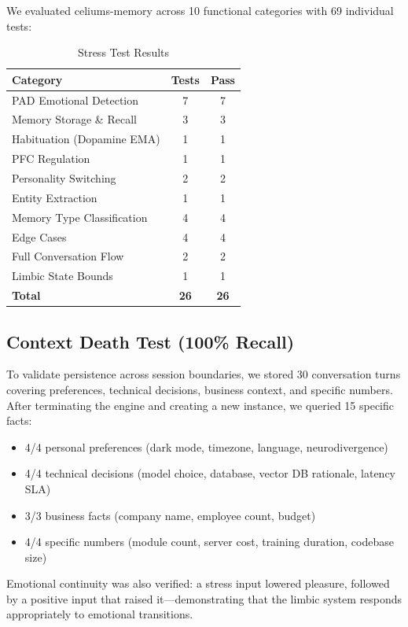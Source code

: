 \documentclass[journal,twoside]{IEEEtran}
\begin{document}
We evaluated celiums-memory across 10 functional categories with 69 individual tests:

\begin{table}[h]
\centering
\caption{Stress Test Results}
\begin{tabular}{lcc}
\toprule
\textbf{Category} & \textbf{Tests} & \textbf{Pass} \\
\midrule
PAD Emotional Detection & 7 & 7 \\
Memory Storage \& Recall & 3 & 3 \\
Habituation (Dopamine EMA) & 1 & 1 \\
PFC Regulation & 1 & 1 \\
Personality Switching & 2 & 2 \\
Entity Extraction & 1 & 1 \\
Memory Type Classification & 4 & 4 \\
Edge Cases & 4 & 4 \\
Full Conversation Flow & 2 & 2 \\
Limbic State Bounds & 1 & 1 \\
\midrule
\textbf{Total} & \textbf{26} & \textbf{26} \\
\bottomrule
\end{tabular}
\label{tab:stress}
\end{table}

\subsection{Context Death Test (100\% Recall)}

To validate persistence across session boundaries, we stored 30 conversation turns covering preferences, technical decisions, business context, and specific numbers. After terminating the engine and creating a new instance, we queried 15 specific facts:

\begin{itemize}
    \item 4/4 personal preferences (dark mode, timezone, language, neurodivergence)
    \item 4/4 technical decisions (model choice, database, vector DB rationale, latency SLA)
    \item 3/3 business facts (company name, employee count, budget)
    \item 4/4 specific numbers (module count, server cost, training duration, codebase size)
\end{itemize}

Emotional continuity was also verified: a stress input lowered pleasure, followed by a positive input that raised it—demonstrating that the limbic system responds appropriately to emotional transitions.
\end{document}
